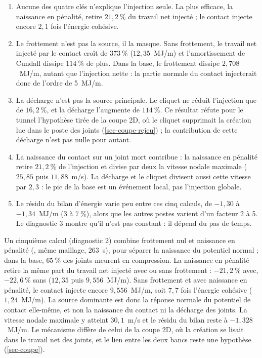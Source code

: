 \begin{enumerate}
\item Aucune des quatre clés n'explique l'injection seule. La plus efficace, la naissance en pénalité, retire $21{,}2~\%$ du travail net injecté ; le contact injecte encore $2{,}1$ fois l'énergie cohésive.
\item Le frottement n'est pas la source, il la masque. Sans frottement, le travail net injecté par le contact croît de $373~\%$ ($12{,}35$~MJ/m) et l'amortissement de Cundall dissipe $114~\%$ de plus. Dans la base, le frottement dissipe $2{,}708$~MJ/m, autant que l'injection nette : la partie normale du contact injecterait donc de l'ordre de 5~MJ/m.
\item La décharge  n'est pas la source principale. Le cliquet ne réduit l'injection que de $16{,}2~\%$, et la décharge  l'augmente de $114~\%$. Ce résultat réfute pour le tunnel l'hypothèse tirée de la coupe 2D, où le cliquet supprimait la création lue dans le poste des joints (\cref{sec-coupe-rejeu}) ; la contribution de cette décharge n'est pas nulle pour autant.
\item La naissance du contact sur un joint mort contribue : la naissance en pénalité retire $21{,}2~\%$ de l'injection et divise par deux la vitesse nodale maximale ($25{,}85$ puis $11{,}88$~m/s). La décharge  et le cliquet divisent aussi cette vitesse par $2{,}3$ : le pic de la base est un événement local, pas l'injection globale.
\item Le résidu du bilan d'énergie varie peu entre ces cinq calculs, de $-1{,}30$ à $-1{,}34$~MJ/m (3 à $7~\%$), alors que les autres postes varient d'un facteur 2 à 5. Le diagnostic 3 montre qu'il n'est pas constant : il dépend du pas de temps.
\end{enumerate}

Un cinquième calcul (diagnostic 2) combine frottement nul et naissance en pénalité (, même maillage, 263~s), pour séparer la naissance du potentiel normal ; dans la base, $65~\%$ des joints meurent en compression. La naissance en pénalité retire la même part du travail net injecté avec ou sans frottement : $-21{,}2~\%$ avec, $-22{,}6~\%$ sans ($12{,}35$ puis $9{,}556$~MJ/m). Sans frottement et avec naissance en pénalité, le contact injecte encore $9{,}556$~MJ/m, soit $7{,}7$ fois l'énergie cohésive ($1{,}24$~MJ/m). La source dominante est donc la réponse normale du potentiel de contact elle-même, et non la naissance du contact ni la décharge des joints. La vitesse nodale maximale y atteint $30{,}1$~m/s et le résidu du bilan reste à $-1{,}328$~MJ/m. Le mécanisme diffère de celui de la coupe 2D, où la création se lisait dans le travail net des joints, et le lien entre les deux bancs reste une hypothèse (\cref{sec-coupe}).

